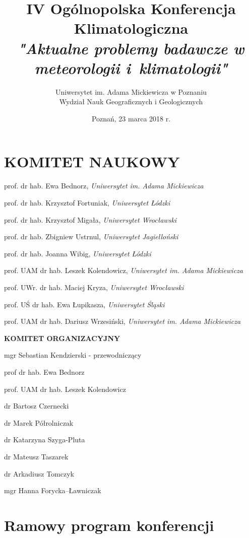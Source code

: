 \documentclass[12pt,oneside]{book}
\title{IV Ogólnopolska Konferencja Klimatologiczna \\ \emph{"Aktualne problemy badawcze w meteorologii i~klimatologii"}}
\date{Poznań, 23 marca 2018 r.}
\author{Uniwersytet im. Adama Mickiewicza w Poznaniu\\Wydział Nauk Geograficznych i Geologicznych}
\begin{document}
% 

\frontmatter
\maketitle

\chapter*{KOMITET NAUKOWY}
\vspace{-0.5cm}

prof. dr hab. Ewa Bednorz, \textit{Uniwersytet im. Adama Mickiewicza}

prof. dr hab. Krzysztof Fortuniak,  \textit{Uniwersytet Łódzki}

prof. dr hab. Krzysztof Migała,  \textit{Uniwersytet Wrocławski}

prof. dr hab. Zbigniew Ustrnul,  \textit{Uniwersytet Jagielloński}

prof. dr hab. Joanna Wibig, \textit{Uniwersytet Łódzki}

prof. UAM dr hab. Leszek Kolendowicz, \textit{Uniwersytet im. Adama Mickiewicza}

prof. UWr. dr hab. Maciej Kryza, \textit{Uniwersytet Wrocławski}

prof. UŚ dr hab. Ewa Łupikasza,  \textit{Uniwersytet Śląski}

prof. UAM dr hab. Dariusz Wrzesiński, \textit{Uniwersytet im. Adama Mickiewicza}


\vspace{2cm}
\Large{\textbf{KOMITET ORGANIZACYJNY}}
\vspace{0.5cm}

\normalsize 

mgr Sebastian Kendzierski - przewodniczący

prof dr hab. Ewa Bednorz

prof. UAM dr hab. Leszek Kolendowicz

dr Bartosz Czernecki

dr Marek Półrolniczak

dr Katarzyna Szyga-Pluta

dr Mateusz Taszarek

dr Arkadiusz Tomczyk

mgr Hanna Forycka--Ławniczak


\chapter{Ramowy program konferencji }
\end{document}

